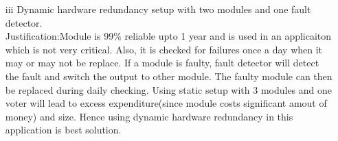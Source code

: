 \documentclass[]{article}
\begin{document}
\begin{itemize}
		\item[iii]Dynamic hardware redundancy setup with two modules and one fault detector.\\Justification:Module is 99\% reliable upto 1 year and is used in an applicaiton which is not very critical. Also, it is checked for failures once a day when it may or may not be replace. If a module is faulty, fault detector will detect the fault and switch the output to other module. The faulty module can then be replaced during daily checking.  Using static setup with 3 modules and one voter will lead to excess expenditure(since module costs significant amout of money) and size.  Hence using dynamic hardware redundancy in this application is best solution.
	\end{itemize} 
	
\end{document}
